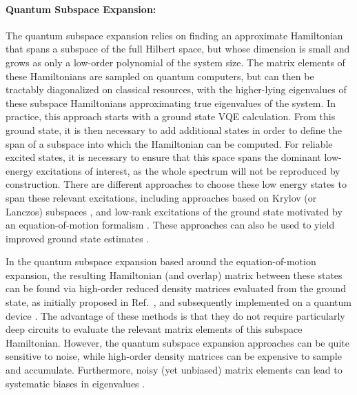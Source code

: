\paragraph{Quantum Subspace Expansion:} The quantum subspace expansion relies on finding an approximate Hamiltonian that spans a subspace of the full Hilbert space, but whose dimension is small and grows as only a low-order polynomial of the system size. The matrix elements of these Hamiltonians are sampled on quantum computers, but can then be tractably diagonalized on classical resources, with the higher-lying eigenvalues of these subspace Hamiltonians approximating true eigenvalues of the system. In practice, this approach starts with a ground state VQE calculation. From this ground state, it is then necessary to add additional states in order to define the span of a subspace into which the Hamiltonian can be computed. For reliable excited states, it is necessary to ensure that this space spans the dominant low-energy excitations of interest, as the whole spectrum will not be reproduced by construction. There are different approaches to choose these low energy states to span these relevant excitations, including approaches based on Krylov (or Lanczos) subspaces \cite{Motta2019,yeter-aydenizPracticalQuantumComputation2020,sunQuantumComputationFiniteTemperature2021}, and low-rank excitations of the ground state motivated by an equation-of-motion formalism \cite{McClean2017,Ollitrault2020}. These approaches can also be used to yield improved ground state estimates \cite{Motta2019,Parrish2019}.

In the quantum subspace expansion based around the equation-of-motion expansion, the resulting Hamiltonian (and overlap) matrix between these states can be found via high-order reduced density matrices evaluated from the ground state, as initially proposed in Ref.~\cite{McClean2017}, and subsequently implemented on a quantum device \cite{collessComputationMolecularSpectra2018}. The advantage of these methods is that they do not require particularly deep circuits to evaluate the relevant matrix elements of this subspace Hamiltonian. However, the quantum subspace expansion approaches can be quite sensitive to noise, while high-order density matrices can be expensive to sample and accumulate. Furthermore, noisy (yet unbiased) matrix elements can lead to systematic biases in eigenvalues \cite{Blunt2018, Epperly2021}.

